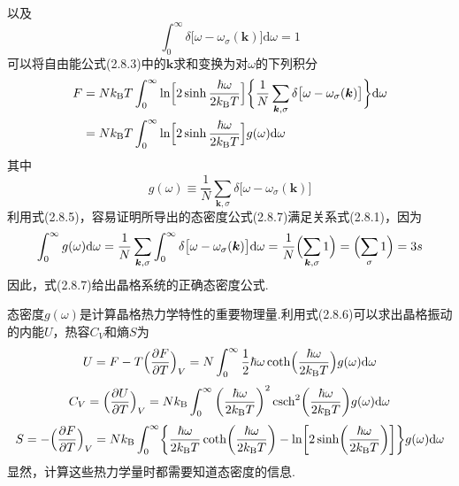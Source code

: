 以及
\begin{equation}
  \int_0^{\infty}\delta\bigl[\omega-\omega_{\sigma}(\boldsymbol{k})\bigr]\mathrm{d}\omega=1
\end{equation}
可以将自由能公式(2.8.3)中的$\boldsymbol{k}$求和变换为对$\omega$的下列积分
\begin{equation}
\begin{aligned}
  F&=Nk_{\mathrm{B}}T\int_0^{\infty}
  \ln\Bigl[2\sinh\frac{\hbar\omega}{2k_{\mathrm{B}}T}\Bigr]
  \biggl\{\frac{1}{N}\sum_{\boldsymbol{k},\sigma}
  \delta\bigl[\omega-\omega_{\sigma}(\boldsymbol{k})\bigr]\biggr\}\mathrm{d}\omega\\
  &=Nk_{\mathrm{B}}T\int_0^{\infty}
  \ln\Bigl[2\sinh\frac{\hbar\omega}{2k_{\mathrm{B}}T}\Bigr]g(\omega)\mathrm{d}\omega
\end{aligned}
\end{equation}
其中
\begin{equation}
  g(\omega)\equiv\frac{1}{N}\sum_{\boldsymbol{k},\sigma}
  \delta\bigl[\omega-\omega_{\sigma}(\boldsymbol{k})\bigr]
\end{equation}
利用式(2.8.5)，容易证明所导出的态密度公式(2.8.7)满足关系式(2.8.1)，因为
\begin{equation*}
  \int_0^{\infty}g(\omega)\mathrm{d}\omega
  =\frac{1}{N}\sum_{\boldsymbol{k},\sigma}\int_0^{\infty}
  \delta\bigl[\omega-\omega_{\sigma}(\boldsymbol{k})\bigr]\mathrm{d}\omega
  =\frac{1}{N}\Bigl(\sum_{\boldsymbol{k},\sigma}1\Bigr)
  =\Bigl(\sum_{\sigma}1\Bigr)=3s
\end{equation*}
因此，式(2.8.7)给出晶格系统的正确态密度公式.

态密度$g(\omega)$是计算晶格热力学特性的重要物理量.利用式(2.8.6)可以求出晶格振动的内能$U$，热容$C_V$和熵$S$为
\begin{equation}
  U=F-T\Bigl(\frac{\partial F}{\partial T}\Bigr)_V
  =N\int_0^{\infty}\frac{1}{2}\hbar\omega
  \coth\Bigl(\frac{\hbar\omega}{2k_{\mathrm{B}}T}\Bigr)g(\omega)\mathrm{d}\omega
\end{equation}
\begin{equation}
  C_V=\Bigl(\frac{\partial U}{\partial T}\Bigr)_V
  =Nk_{\mathrm{B}}\int_0^{\infty}
  \left(\frac{\hbar\omega}{2k_{\mathrm{B}}T}\right)^2
  \mathrm{csch}^2\biggl(\frac{\hbar\omega}{2k_{\mathrm{B}}T}\biggr)
  g(\omega)\mathrm{d}\omega
\end{equation}
\begin{equation}
  S=-\Bigl(\frac{\partial F}{\partial T}\Bigr)_V
  =Nk_{\mathrm{B}}\int_0^{\infty}
  \biggl\{\frac{\hbar\omega}{2k_{\mathrm{B}}T}
  \coth\biggl(\frac{\hbar\omega}{2k_{\mathrm{B}}T}\biggr)
  -\ln\biggl[2\sinh\biggl(\frac{\hbar\omega}{2k_{\mathrm{B}}T}\biggr)\biggr]\biggr\}
  g(\omega)\mathrm{d}\omega
\end{equation}
显然，计算这些热力学量时都需要知道态密度的信息.

